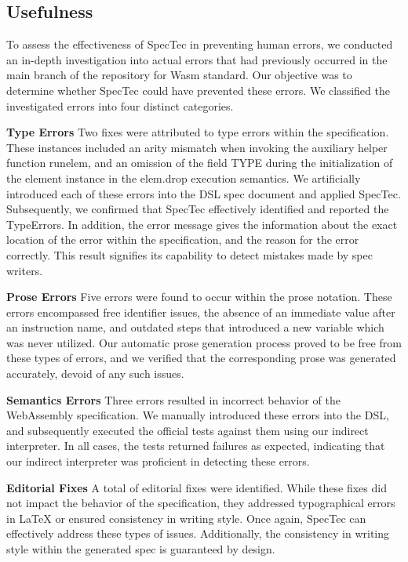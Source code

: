 \subsection{Usefulness}
To assess the effectiveness of SpecTec in preventing human errors, we conducted
an in-depth investigation into actual errors that had previously occurred in
the main branch of the repository for Wasm standard. Our objective was to
determine whether SpecTec could have prevented these errors. We classified the
investigated errors into four distinct categories.

\textbf{Type Errors}
Two fixes were attributed to type errors within the specification. These
instances included an arity mismatch when invoking the auxiliary helper
function runelem, and an omission of the field TYPE during the initialization
of the element instance in the elem.drop execution semantics. We artificially
introduced each of these errors into the DSL spec document and applied SpecTec.
Subsequently, we confirmed that SpecTec effectively identified and reported the
TypeErrors. In addition, the error message gives the information about the
exact location of the error within the specification, and the reason for the
error correctly.  This result signifies its capability to detect mistakes made
by spec writers.

\textbf{Prose Errors}
Five errors were found to occur within the prose notation. These errors
encompassed free identifier issues, the absence of an immediate value after an
instruction name, and outdated steps that introduced a new variable which was
never utilized. Our automatic prose generation process proved to be free from
these types of errors, and we verified that the corresponding prose was
generated accurately, devoid of any such issues.

\textbf{Semantics Errors}
Three errors resulted in incorrect behavior of the WebAssembly specification.
We manually introduced these errors into the DSL, and subsequently executed the
official tests against them using our indirect interpreter. In all cases, the
tests returned failures as expected, indicating that our indirect interpreter
was proficient in detecting these errors.

\textbf{Editorial Fixes}
A total of  editorial fixes were identified. While these fixes did
not impact the behavior of the specification, they addressed typographical
errors in LaTeX or ensured consistency in writing style. Once again, SpecTec
can effectively address these types of issues.  Additionally, the consistency
in writing style within the generated spec is guaranteed by design.

